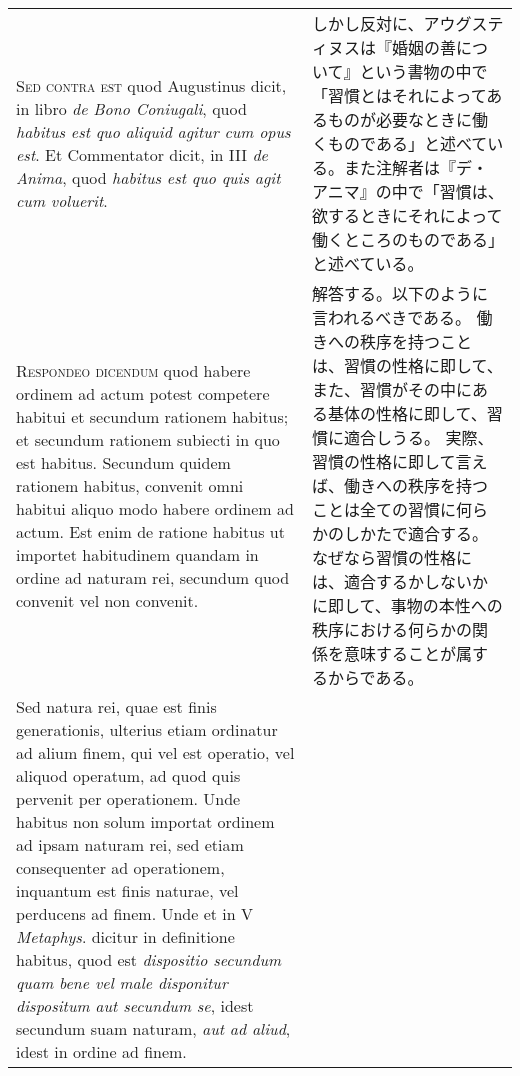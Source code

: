 \documentclass[10pt]{jsarticle} %
\begin{document}
\begin{longtable}{p{21em}p{21em}}
\\



{\scshape Sed contra est} quod Augustinus dicit, in libro {\itshape de Bono Coniugali}, quod
{\itshape habitus est quo aliquid agitur cum opus est}. Et Commentator dicit, in
III {\itshape de Anima}, quod {\itshape habitus est quo quis agit cum voluerit}.

&

しかし反対に、アウグスティヌスは『婚姻の善について』という書物の中で
「習慣とはそれによってあるものが必要なときに働くものである」と述べてい
る。また注解者は『デ・アニマ』の中で「習慣は、欲するときにそれによって
働くところのものである」と述べている。



\\



{\scshape Respondeo dicendum} quod habere ordinem ad actum potest competere
habitui et secundum rationem habitus; et secundum rationem subiecti in
quo est habitus. Secundum quidem rationem habitus, convenit omni
habitui aliquo modo habere ordinem ad actum. Est enim de ratione
habitus ut importet habitudinem quandam in ordine ad naturam rei,
secundum quod convenit vel non convenit. 



&

解答する。以下のように言われるべきである。
働きへの秩序を持つことは、習慣の性格に即して、また、習慣がその中にある基体の性格に即して、習慣に適合しうる。
実際、習慣の性格に即して言えば、働きへの秩序を持つことは全ての習慣に何らかのしかたで適合する。
なぜなら習慣の性格には、適合するかしないかに即して、事物の本性への秩序における何らかの関係を意味することが属するからである。


\\

Sed natura rei, quae est
finis generationis, ulterius etiam ordinatur ad alium finem, qui vel
est operatio, vel aliquod operatum, ad quod quis pervenit per
operationem. Unde habitus non solum importat ordinem ad ipsam naturam
rei, sed etiam consequenter ad operationem, inquantum est finis
naturae, vel perducens ad finem. Unde et in V {\itshape Metaphys}. dicitur in
definitione habitus, quod est {\itshape dispositio secundum quam bene vel male
disponitur dispositum aut secundum se}, idest secundum suam naturam,
{\itshape aut ad aliud}, idest in ordine ad finem. 



&


\end{longtable}
\end{document}
